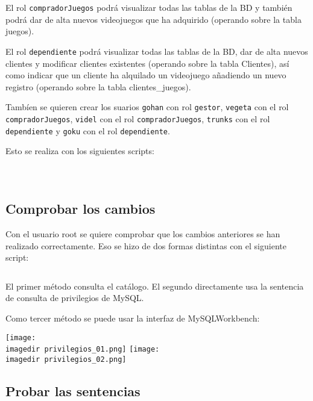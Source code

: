 \documentclass[a4paper, 11pt, oneside]{article} %
\newcommand{\scriptdir}{../scripts/} %
\newcommand{\imagedir}{../images/} %
\begin{document}
El rol \texttt{compradorJuegos} podrá visualizar todas las tablas de la BD y también podrá dar de alta nuevos videojuegos que ha adquirido (operando sobre la tabla juegos).

El rol \texttt{dependiente} podrá visualizar todas las tablas de la BD, dar de alta nuevos clientes y modificar clientes existentes (operando sobre la tabla Clientes), así como indicar que un cliente ha alquilado un videojuego añadiendo un nuevo registro (operando sobre la tabla clientes\_juegos).

Tambíen se quieren crear los suarios \texttt{gohan} con rol \texttt{gestor}, \texttt{vegeta} con el rol \texttt{compradorJuegos}, \texttt{videl} con el rol \texttt{compradorJuegos}, \texttt{trunks} con el rol \texttt{dependiente} y \texttt{goku} con el rol \texttt{dependiente}.

Esto se realiza con los siguientes scripts:

\inputminted{mysql}{\scriptdir scripts_roles/gestor.sql}

\inputminted{mysql}{\scriptdir scripts_roles/comprador_juegos_privileges_and_role_creation.sql}

\inputminted{mysql}{\scriptdir scripts_roles/dependiente_privileges_and_role_creation.sql}

\subsection{Comprobar los cambios}

Con el usuario root se quiere comprobar que los cambios anteriores se han realizado correctamente. Eso se hizo de dos formas distintas con el siguiente script:

\inputminted{mysql}{\scriptdir scripts_consulta_privilegios/check_privileges.sql}

El primer método consulta el catálogo. El segundo directamente usa la sentencia de consulta de privilegios de MySQL.

Como tercer método se puede usar la interfaz de MySQLWorkbench:

\texttt{[image: \\imagedir privilegios\_01.png]}
\texttt{[image: \\imagedir privilegios\_02.png]}

\subsection{Probar las sentencias}
\end{document}
